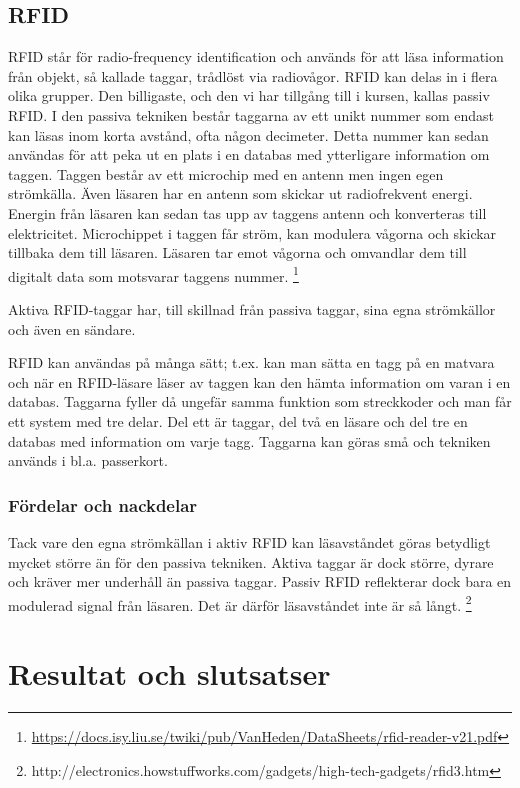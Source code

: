 \documentclass[a4paper,12pt,fleqn]{article}
\begin{document}
\subsection{RFID}
RFID står för radio-frequency identification och används för att läsa information från objekt, så kallade taggar, trådlöst via radiovågor. RFID kan delas in i flera olika grupper. Den billigaste, och den vi har tillgång till i kursen, kallas passiv RFID. I den passiva tekniken består taggarna av ett unikt nummer som endast kan läsas inom korta avstånd, ofta någon decimeter. Detta nummer kan sedan användas för att peka ut en plats i en databas med ytterligare information om taggen. Taggen består av ett microchip med en antenn men ingen egen strömkälla. Även läsaren har en antenn som skickar ut radiofrekvent energi. Energin från läsaren kan sedan tas upp av taggens antenn och konverteras till elektricitet. Microchippet i taggen får ström, kan modulera vågorna och skickar tillbaka dem till läsaren. Läsaren tar emot vågorna och omvandlar dem till digitalt data som motsvarar taggens nummer.
\footnote{\url{https://docs.isy.liu.se/twiki/pub/VanHeden/DataSheets/rfid-reader-v21.pdf}}

Aktiva RFID-taggar har, till skillnad från passiva taggar, sina egna strömkällor och även en sändare.

RFID kan användas på många sätt; t.ex. kan man sätta en tagg på en matvara och när en RFID-läsare läser av taggen kan den hämta information om varan i en databas. Taggarna fyller då ungefär samma funktion som streckkoder och man får ett system med tre delar. Del ett är taggar, del två en läsare och del tre en databas med information om varje tagg. Taggarna kan göras små och tekniken används i bl.a. passerkort.

\subsubsection{Fördelar och nackdelar}
Tack vare den egna strömkällan i aktiv RFID kan läsavståndet göras betydligt mycket större än för den passiva tekniken. Aktiva taggar är dock större, dyrare och kräver mer underhåll än passiva taggar. Passiv RFID reflekterar dock bara en modulerad signal från läsaren. Det är därför läsavståndet inte är så långt.
\footnote{http://electronics.howstuffworks.com/gadgets/high-tech-gadgets/rfid3.htm}


\section{Resultat och slutsatser}
\end{document}
